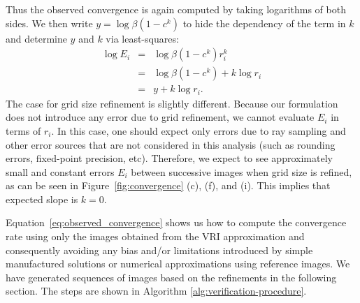 Thus the observed convergence is again computed by taking logarithms
of both sides. We then write $y = \log
\beta (  1 - c^k )$ to hide the dependency of the term in $k$
and determine $y$ and $k$ via least-squares:
\begin{eqnarray}
\log E_i &=& \log \beta (  1 - c^k ) r_i^k\\ 
&=& \log \beta (  1 - c^k ) + k \log r_i \\
&=& y + k \log r_i. \label{eq:observed_convergence}
\end{eqnarray}
The case for grid size refinement is slightly different. Because our 
formulation does not introduce any error due to grid refinement,
we cannot evaluate $E_i$ in terms of $r_i$. In this case,
one should expect only errors due to ray sampling and other
error sources that are not considered in this analysis (such as rounding errors, 
fixed-point precision, etc). Therefore, we expect to see 
approximately small and constant errors $E_i$ between successive images
when grid size is refined, as can
be seen in Figure~\ref{fig:convergence} (c), (f), and (i). This implies that expected
slope is $k = 0$. 


Equation~\eqref{eq:observed_convergence} shows us how to compute the
convergence rate using only the images obtained from the VRI
approximation and consequently avoiding any bias and/or limitations
introduced by simple manufactured solutions or numerical
approximations using reference images. We have generated sequences of
images based on the refinements in the following section.  The steps
are shown in Algorithm \ref{alg:verification-procedure}.

